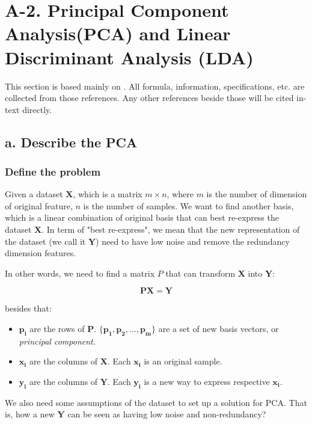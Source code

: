 \section*{A-2. Principal Component Analysis(PCA) and Linear Discriminant Analysis (LDA)}

This section is based mainly on \cite{shlens2014tutorial}. All formula, information, specifications, etc. are collected from those references. Any other references beside those will be cited in-text directly.

\subsection*{a. Describe the PCA}

\subsubsection*{Define the problem}

Given a dataset $\bm{X}$, which is a matrix $m \times n$, where $m$ is the number of dimension of original feature, $n$ is the number of samples. We want to find another basis, which is a linear combination of original basis that can best re-express the dataset $\bm{X}$. In term of "best re-express", we mean that the new representation of the dataset (we call it $\bm{Y}$) need to have low noise and remove the redundancy dimension features.

In other words, we need to find a matrix $P$ that can transform $\bm{X}$ into $\bm{Y}$:

\begin{equation*}
	\bm{PX = Y}
\end{equation*}

besides that:

\begin{itemize}
	\item $\bm{p_i}$ are the rows of $\bm{P}$. $\{ \bm{p_1}, \bm{p_2}, \ldots, \bm{p_m} \}$ are a set of new basis vectors, or \emph{principal component}. 
	\item $\bm{x_i}$ are the columns of $\bm{X}$. Each $\bm{x_i}$ is an original sample.
	\item $\bm{y_i}$ are the columns of $\bm{Y}$. Each $\bm{y_i}$ is a new way to express respective $\bm{x_i}$. 
\end{itemize}

We also need some assumptions of the dataset to set up a solution for PCA. That is, how a new $\bm{Y}$ can be seen as having low noise and non-redundancy?

